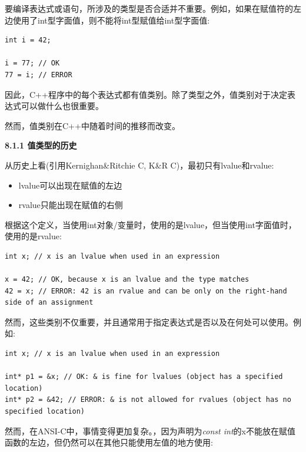 要编译表达式或语句，所涉及的类型是否合适并不重要。例如，如果在赋值符的左边使用了int型字面值，则不能将int型赋值给int型字面值:\par

\begin{lstlisting}[caption={}]
int i = 42;

i = 77; // OK
77 = i; // ERROR
\end{lstlisting}

因此，C++程序中的每个表达式都有值类别。除了类型之外，值类别对于决定表达式可以做什么也很重要。\par

然而，值类别在C++中随着时间的推移而改变。\par

\hspace*{\fill} \par %
\textbf{8.1.1 值类型的历史}

从历史上看(引用Kernighan\&Ritchie C, K\&R C)，最初只有lvalue和rvalue:\par

\begin{itemize}
	\item lvalue可以出现在赋值的左边
	\item rvalue只能出现在赋值的右侧
\end{itemize}

根据这个定义，当使用int对象/变量时，使用的是lvalue，但当使用int字面值时，使用的是rvalue:\par

\begin{lstlisting}[caption={}]
int x; // x is an lvalue when used in an expression

x = 42; // OK, because x is an lvalue and the type matches
42 = x; // ERROR: 42 is an rvalue and can be only on the right-hand side of an assignment
\end{lstlisting}

然而，这些类别不仅重要，并且通常用于指定表达式是否以及在何处可以使用。例如:\par

\begin{lstlisting}[caption={}]
int x; // x is an lvalue when used in an expression

int* p1 = &x; // OK: & is fine for lvalues (object has a specified location)
int* p2 = &42; // ERROR: & is not allowed for rvalues (object has no specified location)
\end{lstlisting}

然而，在ANSI-C中，事情变得更加复杂。，因为声明为\textit{const int}的x不能放在赋值函数的左边，但仍然可以在其他只能使用左值的地方使用:\par


